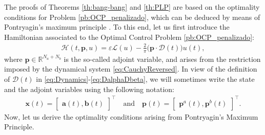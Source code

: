 \documentclass[twocolumn]{autart}    %
\begin{document}
The proofs of Theorems \ref{th:bang-bang} and \ref{th:PLP} are based on the optimality conditions for Problem \ref{pb:OCP_penalizado}, which can be deduced by means of Pontryagin's maximum principle \cite[Chapter~2.7]{bryson1975applied}. To this end, let us first introduce the Hamiltonian  associated to the Optimal Control Problem \ref{pb:OCP_penalizado}:
\begin{align}\label{eq:hamil}
	\mathcal{H}(t,\bm{p},u) = \varepsilon \mathcal{L}(u) - \frac 2\pi\big(\bm{p} \cdot \bm{\mathcal{D}}(t)\big)u(t),
\end{align}
where $\bm{p}\in \mathbb{R}^{N_a+N_b}$ is the so-called adjoint variable, and arises from the restriction imposed by the dynamical system \eqref{eq:CauchyReversed}. In view of the definition of $\bm{\mathcal{D}}(t)$ in \eqref{eq:Dynamics}-\eqref{eq:DalphaDbeta}, we will sometimes write the state and the adjoint variables using the following notation:
\begin{align*}
	\bm{x}(t) = \begin{bmatrix} \bm{a}(t), \bm{b}(t) \end{bmatrix}^\top \quad \text{and}\quad
	\bm{p}(t) = \begin{bmatrix} \bm{p}^a(t), \bm{p}^b(t) \end{bmatrix}^\top.
\end{align*}
Now, let us derive the optimality conditions arising from Pontryagin's Maximum Principle.
\end{document}
